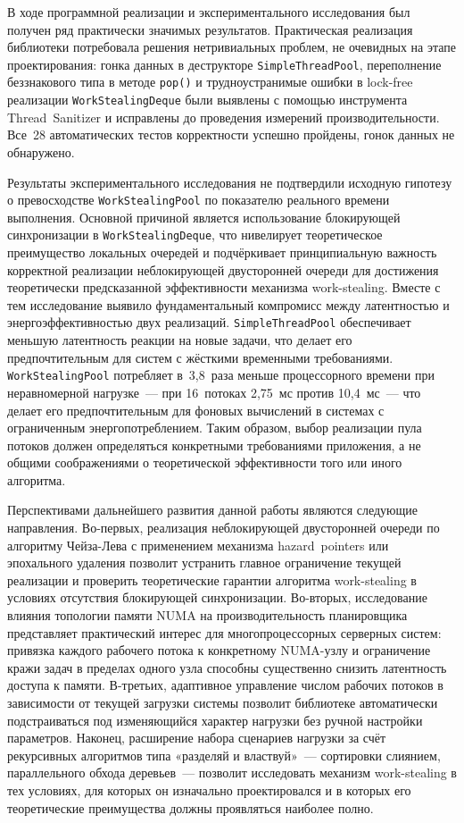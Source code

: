 В ходе программной реализации и экспериментального исследования
был получен ряд практически значимых результатов. Практическая реализация
библиотеки потребовала решения нетривиальных проблем, не очевидных
на этапе проектирования: гонка данных в деструкторе
\texttt{SimpleThreadPool}, переполнение беззнакового типа в методе
\texttt{pop()} и трудноустранимые ошибки в lock-free реализации
\texttt{WorkStealingDeque} были выявлены с помощью инструмента
Thread~Sanitizer и исправлены до проведения измерений производительности.
Все~28 автоматических тестов корректности успешно пройдены, гонок данных
не обнаружено.

Результаты экспериментального исследования не подтвердили исходную
гипотезу о превосходстве \texttt{WorkStealingPool} по показателю
реального времени выполнения. Основной причиной является использование
блокирующей синхронизации в \texttt{WorkStealingDeque}, что нивелирует
теоретическое преимущество локальных очередей и подчёркивает
принципиальную важность корректной реализации неблокирующей двусторонней
очереди для достижения теоретически предсказанной эффективности механизма
work-stealing. Вместе с тем исследование выявило фундаментальный компромисс
между латентностью и энергоэффективностью двух реализаций.
\texttt{SimpleThreadPool} обеспечивает меньшую латентность реакции
на новые задачи, что делает его предпочтительным для систем с жёсткими
временными требованиями. \texttt{WorkStealingPool} потребляет в~3,8~раза
меньше процессорного времени при неравномерной нагрузке~--- при
16~потоках 2,75~мс против 10,4~мс~--- что делает его предпочтительным
для фоновых вычислений в системах с ограниченным энергопотреблением.
Таким образом, выбор реализации пула потоков должен определяться
конкретными требованиями приложения, а не общими соображениями
о теоретической эффективности того или иного алгоритма.

Перспективами дальнейшего развития данной работы являются следующие
направления. Во-первых, реализация неблокирующей двусторонней очереди
по алгоритму Чейза-Лева с применением механизма hazard~pointers
или эпохального удаления позволит устранить главное ограничение текущей
реализации и проверить теоретические гарантии алгоритма work-stealing
в условиях отсутствия блокирующей синхронизации. Во-вторых,
исследование влияния топологии памяти NUMA на производительность
планировщика представляет практический интерес для многопроцессорных
серверных систем: привязка каждого рабочего потока к конкретному
NUMA-узлу и ограничение кражи задач в пределах одного узла способны
существенно снизить латентность доступа к памяти. В-третьих,
адаптивное управление числом рабочих потоков в зависимости от
текущей загрузки системы позволит библиотеке автоматически
подстраиваться под изменяющийся характер нагрузки без ручной
настройки параметров. Наконец, расширение набора сценариев нагрузки
за счёт рекурсивных алгоритмов типа «разделяй и властвуй»~--- сортировки
слиянием, параллельного обхода деревьев~--- позволит исследовать
механизм work-stealing в тех условиях, для которых он изначально
проектировался и в которых его теоретические преимущества должны
проявляться наиболее полно.
